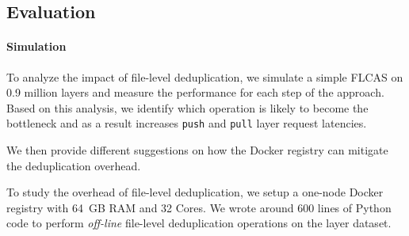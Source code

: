 \subsection{Evaluation}

\paragraph{Simulation}
To analyze the impact of file-level deduplication, we simulate a simple FLCAS on
0.9 million layers and measure the performance for each step of the approach.
%
Based on this analysis, we identify which operation is likely to become the bottleneck
and as a result increases \texttt{push} and \texttt{pull} layer request latencies.

We then provide different suggestions on how the Docker registry can mitigate
the deduplication overhead.





%
%
%


To study the overhead of file-level deduplication, we setup a
one-node Docker registry with 64~GB RAM and 32 Cores.  
%
We wrote around 600 lines of Python code to perform \emph{off-line} file-level deduplication
operations on the layer dataset.
%

